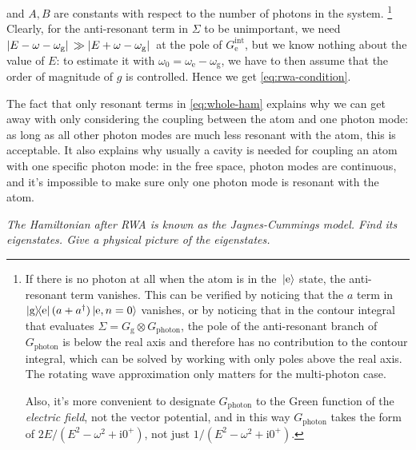 \documentclass[hyperref, a4paper]{article}
\newcommand*{\ii}{\mathrm{i}}
\newcommand*{\omegae}{\omega_{\text{e}}}
\newcommand*{\omegag}{\omega_{\text{g}}}
\newcommand*{\kete}{\ket*{\text{e}}}
\newcommand*{\dyadge}{\dyad{\text{g}}{\text{e}}}
\begin{document}
and $A, B$ are constants with respect to the number of photons in the system.%
\footnote{
    If there is no photon at all when the atom is in the $\kete$ state,
    the anti-resonant term vanishes.
    This can be verified by noticing that the $a$ term in $\dyadge (a + a^\dag) \ket*{\text{e}, n=0}$ vanishes,
    or by noticing that in the contour integral that evaluates $\Sigma = G_{\text{g}} \otimes G_{\text{photon}}$,
    the pole of the anti-resonant branch of $G_{\text{photon}}$ is below the real axis 
    and therefore has no contribution to the contour integral, 
    which can be solved by working with only poles above the real axis.
    The rotating wave approximation only matters for the multi-photon case.
    
    Also, it's more convenient to designate $G_{\text{photon}}$ to the Green function of the \emph{electric field},
    not the vector potential, and in this way $G_{\text{photon}}$ takes the form of $2 E / (E^2 - \omega^2 + \ii 0^+)$, not just $1/(E^2 - \omega^2 + \ii 0^+)$.
}
Clearly, for the anti-resonant term in $\Sigma$ to be unimportant, we need 
$\abs*{E - \omega - \omegag} \gg \abs*{E + \omega - \omegag}$ at the pole of $G^{\text{int}}_{\text{e}}$,
but we know nothing about the value of $E$:
to estimate it with $\omega_0 = \omegae - \omegag$,
we have to then assume that the order of magnitude of $g$ is controlled.
Hence we get \eqref{eq:rwa-condition}.

The fact that only resonant terms in \eqref{eq:whole-ham} explains 
why we can get away with only considering the coupling between the atom and one photon mode:
as long as all other photon modes are much less resonant with the atom,
this is acceptable.
It also explains why usually a cavity is needed for coupling an atom with one specific photon mode:
in the free space, photon modes are continuous, 
and it's impossible to make sure only one photon mode is resonant with the atom.

\textit{The Hamiltonian after RWA is known as the Jaynes-Cummings model. 
Find its eigenstates. Give a physical picture of the eigenstates.}
\end{document}

